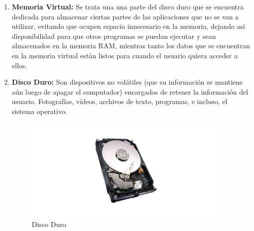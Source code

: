 \documentclass{article}
\begin{document}
\begin{enumerate}
\item \textbf{Memoria Virtual:} Se trata una una parte del disco duro que se encuentra dedicada para almacenar ciertas partes de las aplicaciones que no se van a utilizar, evitando que ocupen espacio innecesario en la memoria, dejando así disponibilidad para que otros programas se puedan ejecutar y sean almacenados en la memoria RAM, mientras tanto los datos que se encuentran en la memoria virtual están listos para cuando el usuario quiera acceder a ellos.

\item \textbf{Disco Duro:} Son dispositivos no volátiles (que su información se mantiene aún luego de apagar el computador) encargados de retener la información del usuario. Fotografías, vídeos, archivos de texto, programas, e incluso, el sistema operativo.\cite{qloudea}
    \begin{figure}[h]
        \centering
        \includegraphics[width=10cm]{Disco Duro.jpg}
        \caption{Disco Duro}
        \label{fig:my_label}
    \end{figure}
\end{enumerate}
\end{document}
